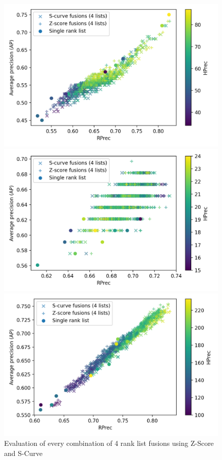 \begin{figure}
  \centering
  \caption{Evaluation of every combination of 4 rank list fusions using Z-Score and S-Curve}

  \label{fig:fusion_oxquarry}
  \includegraphics[width=\linewidth]{img/fusion_oxquarry.png}

  \label{fig:fusion_brunet}
  \includegraphics[width=\linewidth]{img/fusion_brunet.png}

  \label{fig:fusion_st_jean}
  \includegraphics[width=\linewidth]{img/fusion_st_jean.png}
\end{figure}

